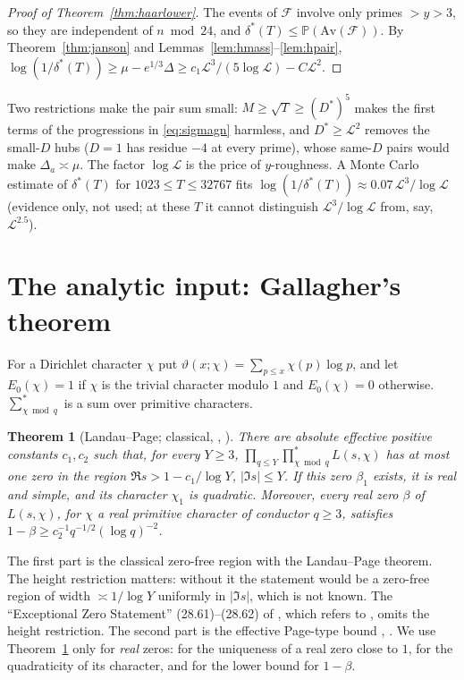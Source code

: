 \documentclass[11pt,reqno]{amsart}
\newtheorem{theorem}{Theorem}[section]
\theoremstyle{definition}
\newcommand{\Lc}{\mathcal L}
\newcommand{\PP}{\mathbb P}
\begin{document}
\begin{proof}[Proof of Theorem~\ref{thm:haarlower}]
The events of $\mathcal F$ involve only primes $>y>3$, so they are independent
of $n\bmod24$, and $\delta^*(T)\le\PP(\mathrm{Av}(\mathcal F))$.  By
Theorem~\ref{thm:janson} and Lemmas~\ref{lem:hmass}--\ref{lem:hpair},
$\log(1/\delta^*(T))\ge\mu-e^{1/3}\Delta\ge c_1\Lc^3/(5\log\Lc)-C\Lc^2$.
\end{proof}

Two restrictions make the pair sum small: $M\ge\sqrt T\ge(D^*)^5$ makes the
first terms of the progressions in \eqref{eq:sigmagn} harmless, and
$D^*\ge\Lc^2$ removes the small-$D$ hubs ($D=1$ has residue $-4$ at every
prime), whose same-$D$ pairs would make $\Delta_a\asymp\mu$.  The factor
$\log\Lc$ is the price of $y$-roughness.  A Monte Carlo estimate of
$\delta^*(T)$ for $1023\le T\le32767$ fits
$\log(1/\delta^*(T))\approx0.07\,\Lc^3/\log\Lc$ (evidence only, not used; at these $T$
it cannot distinguish $\Lc^3/\log\Lc$ from, say, $\Lc^{2.5}$).

\section{The analytic input: Gallagher's theorem}\label{sec:analytic}

For a Dirichlet character $\chi$ put $\vartheta(x;\chi)=\sum_{p\le x}\chi(p)\log p$, and
let $E_0(\chi)=1$ if $\chi$ is the trivial character modulo $1$ and
$E_0(\chi)=0$ otherwise.  $\sum^*_{\chi\bmod q}$ is a sum over primitive
characters.

\begin{theorem}[Landau--Page; classical, {\cite[Ch.~14]{Dav}}, {\cite[Cor.~11.10]{MV1}}]\label{thm:xz}
There are absolute effective positive constants $c_1,c_2$ such that, for
every $Y\ge3$, $\prod_{q\le Y}\prod^*_{\chi\bmod q}L(s,\chi)$ has at most one zero
in the region $\Re s>1-c_1/\log Y$, $|\Im s|\le Y$.  If this zero $\beta_1$
exists, it is real and simple, and its character $\chi_1$ is quadratic.
Moreover, every real zero $\beta$ of $L(s,\chi)$, for $\chi$ a real primitive
character of conductor $q\ge3$, satisfies
$1-\beta\ge c_2^{-1}q^{-1/2}(\log q)^{-2}$.
\end{theorem}

The first part is the classical zero-free region with the Landau--Page
theorem.  The height restriction matters: without it the statement would be
a zero-free region of width $\asymp1/\log Y$ uniformly in $|\Im s|$, which is
not known.  The ``Exceptional Zero Statement'' (28.61)--(28.62) of
\cite{MV3}, which refers to \cite[Cor.~11.10]{MV1}, omits the height
restriction.  The second part is the effective Page-type bound
\cite[Ch.~14]{Dav}, \cite[(28.62)]{MV3}.  We use Theorem~\ref{thm:xz} only
for \emph{real} zeros: for the uniqueness of a real zero close to $1$, for the
quadraticity of its character, and for the lower bound for $1-\beta$.
\end{document}
